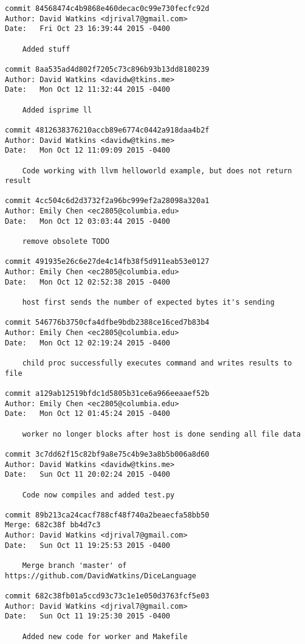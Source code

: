 \begin{verbatim}
commit 84568474c4b9868e460decac0c99e730fecfc92d
Author: David Watkins <djrival7@gmail.com>
Date:   Fri Oct 23 16:39:44 2015 -0400

    Added stuff

commit 8aa535ad4d802f7205c73c896b93b13dd8180239
Author: David Watkins <davidw@tkins.me>
Date:   Mon Oct 12 11:32:44 2015 -0400

    Added isprime ll

commit 4812638376210accb89e6774c0442a918daa4b2f
Author: David Watkins <davidw@tkins.me>
Date:   Mon Oct 12 11:09:09 2015 -0400

    Code working with llvm helloworld example, but does not return result

commit 4cc504c6d2d3732f2a96bc999ef2a28098a320a1
Author: Emily Chen <ec2805@columbia.edu>
Date:   Mon Oct 12 03:03:44 2015 -0400

    remove obsolete TODO

commit 491935e26c6e27de4c14fb38f5d911eab53e0127
Author: Emily Chen <ec2805@columbia.edu>
Date:   Mon Oct 12 02:52:38 2015 -0400

    host first sends the number of expected bytes it's sending

commit 546776b3750cfa4dfbe9bdb2388ce16ced7b83b4
Author: Emily Chen <ec2805@columbia.edu>
Date:   Mon Oct 12 02:19:24 2015 -0400

    child proc successfully executes command and writes results to file

commit a129ab12519bfdc1d5805b31ce6a966eeaaef52b
Author: Emily Chen <ec2805@columbia.edu>
Date:   Mon Oct 12 01:45:24 2015 -0400

    worker no longer blocks after host is done sending all file data

commit 3c7dd62f15c82bf9a8e75c4b9e3a8b5b006a8d60
Author: David Watkins <davidw@tkins.me>
Date:   Sun Oct 11 20:02:24 2015 -0400

    Code now compiles and added test.py

commit 89b213ca24cacf788cf48f740a2beaecfa58bb50
Merge: 682c38f bb4d7c3
Author: David Watkins <djrival7@gmail.com>
Date:   Sun Oct 11 19:25:53 2015 -0400

    Merge branch 'master' of https://github.com/DavidWatkins/DiceLanguage

commit 682c38fb01a5ccd93c73c1e1e050d3763fcf5e03
Author: David Watkins <djrival7@gmail.com>
Date:   Sun Oct 11 19:25:30 2015 -0400

    Added new code for worker and Makefile


\end{verbatim}
